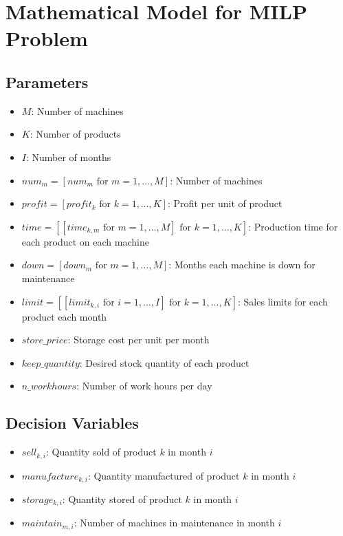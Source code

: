 \documentclass{article}
\begin{document}
\section*{Mathematical Model for MILP Problem}

\subsection*{Parameters}
\begin{itemize}
    \item $M$: Number of machines
    \item $K$: Number of products
    \item $I$: Number of months
    \item $num_m = [num_{m} \text{ for } m = 1,\ldots,M]$: Number of machines
    \item $profit = [profit_{k} \text{ for } k = 1,\ldots,K]$: Profit per unit of product
    \item $time = [[time_{k,m} \text{ for } m = 1,\ldots,M] \text{ for } k = 1,\ldots,K]$: Production time for each product on each machine
    \item $down = [down_{m} \text{ for } m = 1,\ldots,M]$: Months each machine is down for maintenance
    \item $limit = [[limit_{k,i} \text{ for } i = 1,\ldots,I] \text{ for } k = 1,\ldots,K]$: Sales limits for each product each month
    \item $store\_price$: Storage cost per unit per month
    \item $keep\_quantity$: Desired stock quantity of each product
    \item $n\_workhours$: Number of work hours per day
\end{itemize}

\subsection*{Decision Variables}
\begin{itemize}
    \item $sell_{k,i}$: Quantity sold of product $k$ in month $i$
    \item $manufacture_{k,i}$: Quantity manufactured of product $k$ in month $i$
    \item $storage_{k,i}$: Quantity stored of product $k$ in month $i$
    \item $maintain_{m,i}$: Number of machines in maintenance in month $i$
\end{itemize}
\end{document}
